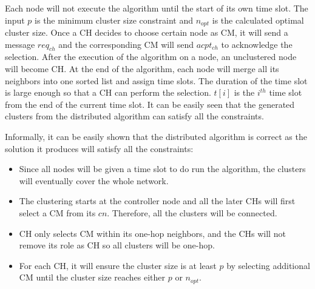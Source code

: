 Each node will not execute the algorithm until the start of its own time slot. The input \(p\) is the minimum cluster size constraint and \(n_{opt}\) is the calculated optimal cluster size. Once a CH decides to choose certain node as CM, it will send a message \(req_{ch}\) and the corresponding CM will send \(acpt_{ch}\) to acknowledge the selection. After the execution of the algorithm on a node, an unclustered node will become CH. At the end of the algorithm, each node will merge all its neighbors into one sorted list and assign time slots. The duration of the time slot is large enough so that a CH can perform the selection. \(t[i]\) is the \(i^{th}\) time slot from the end of the current time slot. It can be easily seen that the generated clusters from the distributed algorithm can satisfy all the constraints.

Informally, it can be easily shown that the distributed algorithm is correct as the solution it produces will satisfy all the constraints:
\begin{itemize}
\item Since all nodes will be given a time slot to do run the algorithm, the clusters will eventually cover the whole network.
\item The clustering starts at the controller node and all the later CHs will first select a CM from its \(cn\). Therefore, all the clusters will be connected.
\item CH only selects CM within its one-hop neighbors, and the CHs will not remove its role as CH so all clusters will be one-hop.
\item For each CH, it will ensure the cluster size is at least \(p\) by selecting additional CM until the cluster size reaches either \(p\) or \(n_{opt}\).
\end{itemize}